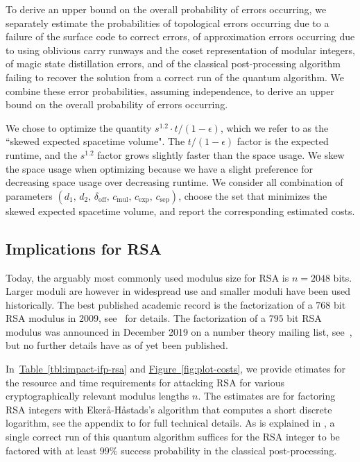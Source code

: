 \documentclass[superscriptaddress,notitlepage,longbibliography]{revtex4-1}
\theoremstyle{definition}
\theoremstyle{definition}
\newcommand{\fig}[1]{\hyperref[fig:#1]{Figure~\ref*{fig:#1}}}
\newcommand{\tbl}[1]{\hyperref[tbl:#1]{Table~\ref*{tbl:#1}}}
\newcommand{\devoff}{{\delta_{\text{off}}}}
\newcommand{\gexp}{{c_{\text{exp}}}}
\newcommand{\gmul}{{c_{\text{mul}}}}
\newcommand{\gsep}{{c_{\text{sep}}}}
\newcommand{\distone}{{d_1}}
\newcommand{\disttwo}{{d_2}}
\begin{document}
To derive an upper bound on the overall probability of errors occurring, we separately estimate the probabilities
  of topological errors occurring due to a failure of the surface code to correct errors,
  of approximation errors occurring due to using oblivious carry runways and the coset representation of modular integers,
  of magic state distillation errors,
  and of the classical post-processing algorithm failing to recover the solution from a correct run of the quantum algorithm.
We combine these error probabilities, assuming independence, to derive an upper bound on the overall probability of errors occurring.

We chose to optimize the quantity $s^{1.2} \cdot t / (1 - \epsilon)$, which we refer to as the ``skewed expected spacetime volume".
The $t / (1 - \epsilon)$ factor is the expected runtime, and the $s^{1.2}$ factor grows slightly faster than the space usage.
We skew the space usage when optimizing because we have a slight preference for decreasing space usage over decreasing runtime.
We consider all combination of parameters $(\distone, \, \disttwo, \, \devoff, \, \gmul, \, \gexp, \, \gsep)$, choose the set that minimizes the skewed expected spacetime volume, and report the corresponding estimated costs.

\subsection{Implications for RSA}
Today, the arguably most commonly used modulus size for RSA is $n=2048$ bits.
Larger moduli are however in widespread use and smaller moduli have been used historically.
The best published academic record is the factorization of a $768$ bit RSA modulus in 2009, see~\cite{kleinjung-rsa768} for details.
The factorization of a $795$ bit RSA modulus was announced in December 2019 on a number theory mailing list, see~\cite{thome-rsa795}, but no further details have as of yet been published.

In~\tbl{impact-ifp-rsa} and \fig{plot-costs}, we provide etimates for the resource and time requirements for attacking RSA for various cryptographically relevant modulus lengths $n$. The estimates are for factoring RSA integers with Ekerå-Håstads's algorithm \cite{ekeraa2017quantum,  ekeraa2017pp} that computes a short discrete logarithm, see the appendix to \cite{ekeraa2017pp} for full technical details. As is explained in \cite{ekeraa2017pp}, a single correct run of this quantum algorithm suffices for the RSA integer to be factored with at least $99\%$ success probability in the classical post-processing.
\end{document}
